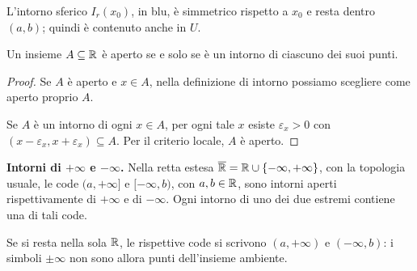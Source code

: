 \begin{schema}
\par\smallskip L'intorno sferico $I_r(x_0)$, in blu, è simmetrico rispetto a $x_0$ e resta dentro $(a,b)$; quindi è contenuto anche in $U$.
\end{schema}

\begin{proposizione}
Un insieme $A\subseteq\mathbb{R}$ è aperto se e solo se è un intorno di ciascuno dei suoi punti.
\end{proposizione}
\begin{proof}
\passomath{\Rightarrow} Se $A$ è aperto e $x\in A$, nella definizione di intorno possiamo scegliere come aperto proprio $A$.

\passomath{\Leftarrow} Se $A$ è un intorno di ogni $x\in A$, per ogni tale $x$ esiste $\varepsilon_x>0$ con $(x-\varepsilon_x,x+\varepsilon_x)\subseteq A$. Per il criterio locale, $A$ è aperto.
\end{proof}

\textbf{Intorni di $+\infty$ e $-\infty$.} Nella retta estesa $\overline{\mathbb{R}}=\mathbb{R}\cup\{-\infty,+\infty\}$, con la topologia usuale, le code $(a,+\infty]$ e $[-\infty,b)$, con $a,b\in\mathbb{R}$, sono intorni aperti rispettivamente di $+\infty$ e di $-\infty$. Ogni intorno di uno dei due estremi contiene una di tali code.

Se si resta nella sola $\mathbb{R}$, le rispettive code si scrivono $(a,+\infty)$ e $(-\infty,b)$: i simboli $\pm\infty$ non sono allora punti dell'insieme ambiente.

